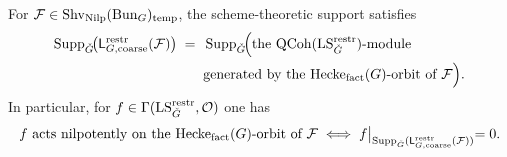 \begin{theorem}\label{thm:hecke-orbit-support}
For $\mathcal F\in \mathrm{Shv}_{\mathrm{Nilp}}(\mathrm{Bun}_G)_{\mathrm{temp}}$, the scheme-theoretic support satisfies
\[
\begin{aligned}
\operatorname{Supp}_{\check G}\!\bigl(\mathsf L^{\mathrm{restr}}_{G,\mathrm{coarse}}(\mathcal F)\bigr)
\;=\;&\;\operatorname{Supp}_{\check G}\!\Bigl(\text{the }\mathrm{QCoh}(\mathrm{LS}^{\mathrm{restr}}_{\check G})\text{-module}\\
&\;\text{generated by the }\mathrm{Hecke}_{\mathrm{fact}}(G)\text{-orbit of }\mathcal F\Bigr).
\end{aligned}
\]
In particular, for $f\in\Gamma(\mathrm{LS}^{\mathrm{restr}}_{\check G},\mathcal O)$ one has
\[
\text{$f$ acts nilpotently on the $\mathrm{Hecke}_{\mathrm{fact}}(G)$-orbit of $\mathcal F$}
\iff f\bigl|_{\operatorname{Supp}_{\check G}(\mathsf L^{\mathrm{restr}}_{G,\mathrm{coarse}}(\mathcal F))}=0.
\]
\end{theorem}

